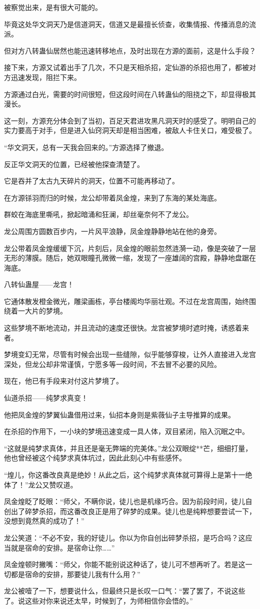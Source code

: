 \begin{this_body}
被察觉出来，是有很大可能的。

毕竟这处华文洞天乃是信道洞天，信道又是最擅长侦查，收集情报、传播消息的流派。

但对方八转蛊仙居然也能迅速转移地点，及时出现在方源的面前，这是什么手段？

接下来，方源又试着出手了几次，不只是天相杀招，定仙游的杀招也用了，都被对方迅速发现，阻拦下来。

方源通过白光，需要的时间很短，但这段时间在八转蛊仙的阻挠之下，却显得极其漫长。

这一刻，方源充分体会到了当初，百足天君进攻黑凡洞天时的感受了。明明自己的实力要高于对手，但是进入仙窍洞天却是相当困难，被敌人卡住关口，难受极了。

“华文洞天，总有一天我会回来的。”方源选择了撤退。

反正华文洞天的位置，已经被他探查清楚了。

它是吞并了太古九天碎片的洞天，位置不可能再移动了。

在方源铩羽而归的时候，龙公却带着凤金煌，来到了东海的某处海底。

群蛟在海底里嘶吼，掀起暗涌和狂澜，却丝毫奈何不了龙公。

龙公周围方圆数百步内，一片风平浪静，凤金煌静静地站在他的身旁。

龙公带着凤金煌缓缓下沉，片刻后，凤金煌的眼前忽然涟漪一动，像是突破了一层无形的薄膜。随后，她双眼瞳孔微微一缩，发现了一座雄阔的宫殿，静静地盘踞在海底。

八转仙蛊屋——龙宫！

它通体散发橙金微光，雕梁画栋，亭台楼阁均华丽壮观。不过在龙宫周围，始终围绕着一大片的梦境。

这些梦境不断地流动，并且流动的速度还很快。龙宫被梦境时遮时掩，诱惑着来者。

梦境变幻无常，尽管有时候会出现一些缝隙，似乎能够穿梭，让外人直接进入龙宫深处，但龙公却非常谨慎，宁愿多等一段时间，不去冒不必要的风险。

现在，他已有手段来对付这片梦境了。

仙道杀招——纯梦求真变！

他把凤金煌的梦翼仙蛊借用过来，仙招本身则是紫薇仙子主导推算的成果。

在杀招的作用下，一小块的梦境迅速变成一具人体，双目紧闭，陷入沉眠之中。

“这就是纯梦求真体，并且还是毫无弊端的完美体。”龙公双眼绽**芒，细细打量，他也曾经被这个纯梦求真体坑过，因此此刻心中有些感怀。

“煌儿，你这番改良真是绝妙！从此之后，这个纯梦求真体就可算得上是第十一绝体了！”龙公又赞叹道。

凤金煌眨了眨眼：“师父，不瞒你说，徒儿也是机缘巧合。因为前段时间，徒儿自创出了碎梦杀招，而这番改良正是用了碎梦的成果。徒儿也是纯粹想要尝试一下，没想到竟然真的成功了！”

龙公笑道：“不必不安，我的好徒儿。你以为你自创出碎梦杀招，是巧合吗？这应当就是宿命的安排。是宿命让你……”

凤金煌顿时撇嘴：“师父，你能不能别说这种话了，徒儿可不想再听了。若是这一切都是宿命的安排，那要徒儿我有什么用？”

龙公被噎了一下，想要说什么，但最终只是长叹一口气：“罢了罢了，不说这些了。说这些对你来说还太早，时候到了，为师相信你会悟的。”

\end{this_body}

